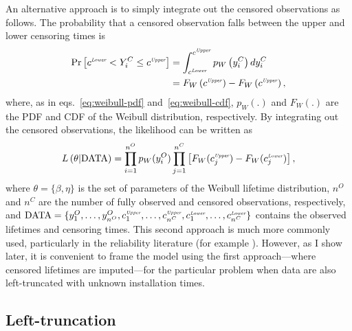 An alternative approach is to simply integrate out the censored observations as follows. The probability that a censored observation falls between the upper and lower censoring times is
\begin{align*}
    \label{eq:integrate-out-cens}
    \text{Pr}\left[c^{\textit{\tiny{Lower}}} < Y^C_i \leq c^{\textit{\tiny{Upper}}}\right] & = \int_{c^{\textit{\tiny{Lower}}}}^{c^{\textit{\tiny{Upper}}}} p_W\left(y^C_i\right) d y^C_i \\
    & = F_W\left(c^{\textit{\tiny{Upper}}}\right) - F_W\left(c^{\textit{\tiny{Upper}}}\right),
\end{align*}
where, as in eqs.~\eqref{eq:weibull-pdf} and~\eqref{eq:weibull-cdf}, $p_W(.)$ and $F_W(.)$ are the PDF and CDF of the Weibull distribution, respectively. By integrating out the censored observations, the likelihood can be written as
\begin{equation}
    \label{eq:censored_likelihood}
    L\left(\theta|\text{DATA}\right) = \prod^{n^O}_{i = 1}p_W(y^O_i)
    \prod^{n^C}_{j = 1}\left[F_W(c^{\textit{\tiny{Upper}}}_j) - F_W(c^{\textit{\tiny{Lower}}}_j)\right],
\end{equation}
where $\theta = \{\beta, \eta\}$ is the set of parameters of the Weibull lifetime distribution, $n^O$ and $n^C$ are the number of fully observed and censored observations, respectively, and $\text{DATA} = \{y^O_1, 
\dots, y^O_{n^O}, c^{\textit{\tiny{Upper}}}_1, \dots, c^{\textit{\tiny{Upper}}}_{n^C}, c^{\textit{\tiny{Lower}}}_1, \dots, c^{\textit{\tiny{Lower}}}_{n^C}\}$ contains the observed lifetimes and censoring times. This second approach is much more commonly used, particularly in the reliability literature (for example \citet{Meeker2022,tian2024,hong2009,mittman2013}). However, as I show later, it is convenient to frame the model using the first approach---where censored lifetimes are imputed---for the particular problem when data are also left-truncated with unknown installation times.

\subsection{Left-truncation}

